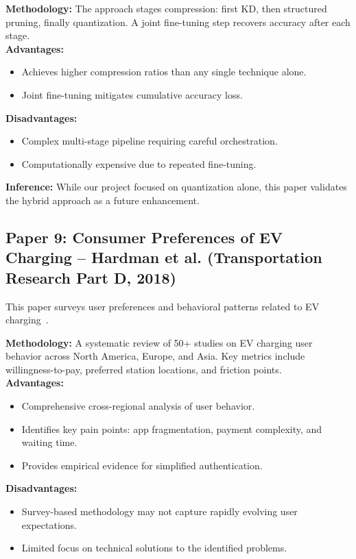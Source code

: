 \documentclass[11pt]{report}
\begin{document}
\textbf{Methodology:} The approach stages compression: first KD, then structured pruning, finally quantization. A joint fine-tuning step recovers accuracy after each stage. \\

\textbf{Advantages:}
\begin{itemize}
    \item Achieves higher compression ratios than any single technique alone.
    \item Joint fine-tuning mitigates cumulative accuracy loss.
\end{itemize}

\textbf{Disadvantages:}
\begin{itemize}
    \item Complex multi-stage pipeline requiring careful orchestration.
    \item Computationally expensive due to repeated fine-tuning.
\end{itemize}

\textbf{Inference:}
While our project focused on quantization alone, this paper validates the hybrid approach as a future enhancement.

\subsection{Paper 9: Consumer Preferences of EV Charging -- Hardman et al. (Transportation Research Part D, 2018)}
This paper surveys user preferences and behavioral patterns related to EV charging~\cite{hardman2018}. \par

\textbf{Methodology:} A systematic review of 50+ studies on EV charging user behavior across North America, Europe, and Asia. Key metrics include willingness-to-pay, preferred station locations, and friction points. \\

\textbf{Advantages:}
\begin{itemize}
    \item Comprehensive cross-regional analysis of user behavior.
    \item Identifies key pain points: app fragmentation, payment complexity, and waiting time.
    \item Provides empirical evidence for simplified authentication.
\end{itemize}

\textbf{Disadvantages:}
\begin{itemize}
    \item Survey-based methodology may not capture rapidly evolving user expectations.
    \item Limited focus on technical solutions to the identified problems.
\end{itemize}
\end{document}
